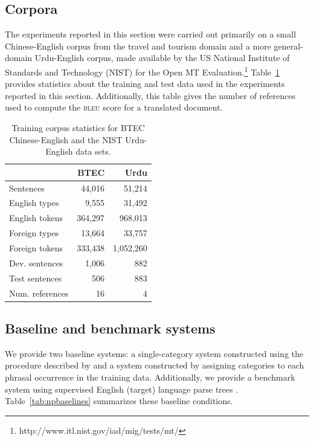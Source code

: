 \subsection{Corpora}

The experiments reported in this section were carried out primarily on a small Chinese-English corpus from the travel and tourism domain \citep{btec} and a more general-domain Urdu-English corpus, made available by the US National Institute of Standards and Technology (NIST) for the Open MT Evaluation.\footnote{http://www.itl.nist.gov/iad/mig/tests/mt/} Table~\ref{tab:corpbtecur} provides statistics about the training and test data used in the experiments reported in this section.  Additionally, this table gives the number of references used to compute the \textsc{bleu} score for a translated document.

\begin{table}[h]
\caption{Training corpus statistics for BTEC Chinese-English and the NIST Urdu-English data sets.}
\begin{center}
\begin{tabular}{l|r|r}
& BTEC & Urdu \\
\hline
Sentences & 44,016 & 51,214 \\
English types & 9,555 & 31,492 \\
English tokens & 364,297 & 968,013 \\
Foreign types & 13,664 & 33,757 \\
Foreign tokens & 333,438 & 1,052,260 \\
\hline
Dev. sentences & 1,006 & 882 \\
Test sentences & 506 & 883 \\
Num. references & 16 & 4
\end{tabular}
\end{center}
\label{tab:corpbtecur}
\end{table}%

\subsection{Baseline and benchmark systems}

We provide two baseline systems: a single-category system constructed using the procedure described by \cite{chiang:2007} and a system constructed by assigning categories to each phrasal occurrence in the training data.  Additionally, we provide a benchmark system using supervised English (target) language parse trees \citep{samt}.  Table~\ref{tab:npbaselines} summarizes these baseline conditions.

